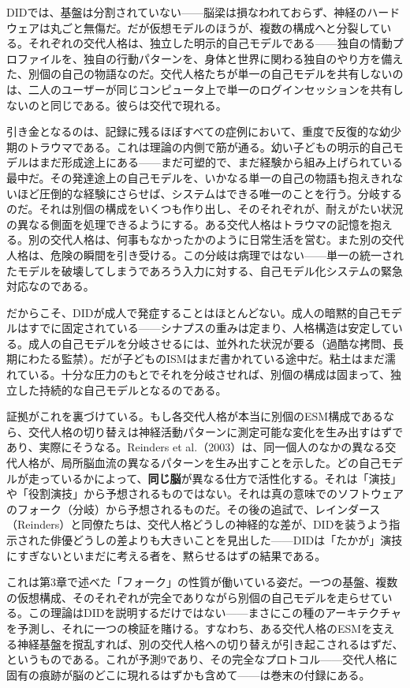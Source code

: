 \documentclass[11pt, twoside, openright]{book}
\begin{document}
DIDでは、基盤は分割されていない------脳梁は損なわれておらず、神経のハードウェアは丸ごと無傷だ。だが仮想モデルのほうが、複数の構成へと分裂している。それぞれの交代人格は、独立した明示的自己モデルである------独自の情動プロファイルを、独自の行動パターンを、身体と世界に関わる独自のやり方を備えた、別個の自己の物語なのだ。交代人格たちが単一の自己モデルを共有しないのは、二人のユーザーが同じコンピュータ上で単一のログインセッションを共有しないのと同じである。彼らは交代で現れる。

引き金となるのは、記録に残るほぼすべての症例において、重度で反復的な幼少期のトラウマである。これは理論の内側で筋が通る。幼い子どもの明示的自己モデルはまだ形成途上にある------まだ可塑的で、まだ経験から組み上げられている最中だ。その発達途上の自己モデルを、いかなる単一の自己の物語も抱えきれないほど圧倒的な経験にさらせば、システムはできる唯一のことを行う。分岐するのだ。それは別個の構成をいくつも作り出し、そのそれぞれが、耐えがたい状況の異なる側面を処理できるようにする。ある交代人格はトラウマの記憶を抱える。別の交代人格は、何事もなかったかのように日常生活を営む。また別の交代人格は、危険の瞬間を引き受ける。この分岐は病理ではない------単一の統一されたモデルを破壊してしまうであろう入力に対する、自己モデル化システムの緊急対応なのである。

だからこそ、DIDが成人で発症することはほとんどない。成人の暗黙的自己モデルはすでに固定されている------シナプスの重みは定まり、人格構造は安定している。成人の自己モデルを分岐させるには、並外れた状況が要る（過酷な拷問、長期にわたる監禁）。だが子どものISMはまだ書かれている途中だ。粘土はまだ濡れている。十分な圧力のもとでそれを分岐させれば、別個の構成は固まって、独立した持続的な自己モデルとなるのである。

証拠がこれを裏づけている。もし各交代人格が本当に別個のESM構成であるなら、交代人格の切り替えは神経活動パターンに測定可能な変化を生み出すはずであり、実際にそうなる。Reinders et al.（2003）は、同一個人のなかの異なる交代人格が、局所脳血流の異なるパターンを生み出すことを示した。どの自己モデルが走っているかによって、\textbf{同じ脳}が異なる仕方で活性化する。それは「演技」や「役割演技」から予想されるものではない。それは真の意味でのソフトウェアのフォーク（分岐）から予想されるものだ。その後の追試で、レインダース（Reinders）と同僚たちは、交代人格どうしの神経的な差が、DIDを装うよう指示された俳優どうしの差よりも大きいことを見出した------DIDは「たかが」演技にすぎないといまだに考える者を、黙らせるはずの結果である。

これは第3章で述べた「フォーク」の性質が働いている姿だ。一つの基盤、複数の仮想構成、そのそれぞれが完全でありながら別個の自己モデルを走らせている。この理論はDIDを説明するだけではない------まさにこの種のアーキテクチャを予測し、それに一つの検証を賭ける。すなわち、ある交代人格のESMを支える神経基盤を撹乱すれば、別の交代人格への切り替えが引き起こされるはずだ、というものである。これが予測9であり、その完全なプロトコル------交代人格に固有の痕跡が脳のどこに現れるはずかも含めて------は巻末の付録にある。
\end{document}
